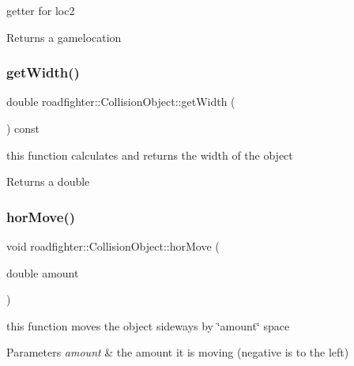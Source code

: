 getter for loc2 \begin{DoxyReturn}{Returns}
a gamelocation 
\end{DoxyReturn}
\mbox{\label{classroadfighter_1_1CollisionObject_ab8692ffb0324d39a96f31c780f7a8172}} 
\subsubsection{\texorpdfstring{get\+Width()}{getWidth()}}
{\footnotesize\ttfamily double roadfighter\+::\+Collision\+Object\+::get\+Width (\begin{DoxyParamCaption}{ }\end{DoxyParamCaption}) const}

this function calculates and returns the width of the object \begin{DoxyReturn}{Returns}
a double 
\end{DoxyReturn}
\mbox{\label{classroadfighter_1_1CollisionObject_a907fbb9f4a45996690b4f35bc4256e47}} 
\subsubsection{\texorpdfstring{hor\+Move()}{horMove()}}
{\footnotesize\ttfamily void roadfighter\+::\+Collision\+Object\+::hor\+Move (\begin{DoxyParamCaption}\item[{double}]{amount }\end{DoxyParamCaption})}

this function moves the object sideways by \char`\"{}amount\char`\"{} space 
\begin{DoxyParams}{Parameters}
{\em amount} & the amount it is moving (negative is to the left) \\
\hline
\end{DoxyParams}
\mbox{\label{classroadfighter_1_1CollisionObject_a2891183d9769adbc9a9c0dc65db1af10}} 

